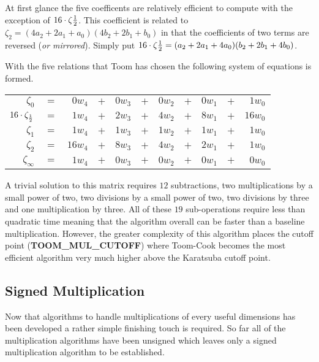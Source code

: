 \documentclass[b5paper]{book}
\begin{document}
At first glance the five coefficents are relatively efficient to compute with the exception of $16 \cdot \zeta{1 \over 2}$.  This coefficient
is related to $\zeta_2 = (4a_2 + 2a_1 + a_0)(4b_2 + 2b_1 + b_0)$ in that the coefficients  of two terms are reversed (\textit{or mirrored}).  
Simply put $16 \cdot \zeta{1 \over 2} = (a_2 + 2a_1 + 4a_0)(b_2 + 2b_1 + 4b_0)$.  

With the five relations that Toom has chosen the following system of equations is formed.

\begin{center}
\begin{tabular}{rcrcrcrcrcr}
$\zeta_0$                    & $=$ & $0w_4$ & $+$ & $0w_3$ & $+$ & $0w_2$ & $+$ & $0w_1$ & $+$ & $1w_0$  \\
$16 \cdot \zeta_{1 \over 2}$ & $=$ & $1w_4$ & $+$ & $2w_3$ & $+$ & $4w_2$ & $+$ & $8w_1$ & $+$ & $16w_0$  \\
$\zeta_1$                    & $=$ & $1w_4$ & $+$ & $1w_3$ & $+$ & $1w_2$ & $+$ & $1w_1$ & $+$ & $1w_0$  \\
$\zeta_2$                    & $=$ & $16w_4$ & $+$ & $8w_3$ & $+$ & $4w_2$ & $+$ & $2w_1$ & $+$ & $1w_0$  \\
$\zeta_{\infty}$             & $=$ & $1w_4$ & $+$ & $0w_3$ & $+$ & $0w_2$ & $+$ & $0w_1$ & $+$ & $0w_0$  \\
\end{tabular}
\end{center}

A trivial solution to this matrix requires $12$ subtractions, two multiplications by a small power of two, two divisions by a small power
of two, two divisions by three and one multiplication by three.  All of these $19$ sub-operations require less than quadratic time meaning that
the algorithm overall can be faster than a baseline multiplication.  However, the greater complexity of this algorithm places the cutoff point
(\textbf{TOOM\_MUL\_CUTOFF}) where Toom-Cook becomes the most efficient algorithm very much higher above the Karatsuba cutoff point.  

\subsection{Signed Multiplication}
Now that algorithms to handle multiplications of every useful dimensions has been developed a rather simple finishing touch is required.  So far all
of the multiplication algorithms have been unsigned which leaves only a signed multiplication algorithm to be established.  
\end{document}
